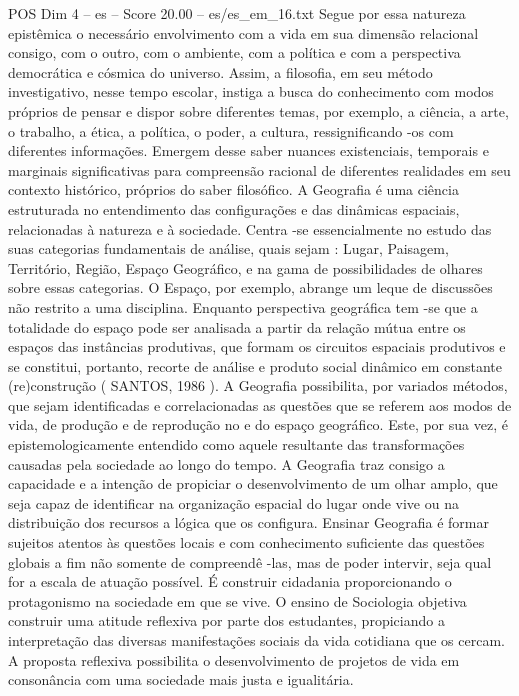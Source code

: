 \begin{textsample}{POS Dim 4 – es – Score 20.00 – es/es\_em\_16.txt}
Segue por essa natureza epistêmica o necessário envolvimento com a vida em sua dimensão relacional consigo, com o outro, com o ambiente, com a política e com a perspectiva democrática e cósmica do universo.
Assim, a filosofia, em seu método investigativo, nesse tempo escolar, instiga a busca do conhecimento com modos próprios de pensar e dispor sobre diferentes temas, por exemplo, a ciência, a arte, o trabalho, a ética, a política, o poder, a cultura, ressignificando -os com diferentes informações.
Emergem desse saber nuances existenciais, temporais e marginais significativas para compreensão racional de diferentes realidades em seu contexto histórico, próprios do saber filosófico.
A Geografia é uma ciência estruturada no entendimento das configurações e das dinâmicas espaciais, relacionadas à natureza e à sociedade.
Centra -se essencialmente no estudo das suas categorias fundamentais de análise, quais sejam : Lugar, Paisagem, Território, Região, Espaço Geográfico, e na gama de possibilidades de olhares sobre essas categorias.
O Espaço, por exemplo, abrange um leque de discussões não restrito a uma disciplina.
Enquanto perspectiva geográfica tem -se que a totalidade do espaço pode ser analisada a partir da relação mútua entre os espaços das instâncias produtivas, que formam os circuitos espaciais produtivos e se constitui, portanto, recorte de análise e produto social dinâmico em constante (re)construção ( SANTOS, 1986 ).
A Geografia possibilita, por variados métodos, que sejam identificadas e correlacionadas as questões que se referem aos modos de vida, de produção e de reprodução no e do espaço geográfico.
Este, por sua vez, é epistemologicamente entendido como aquele resultante das transformações causadas pela sociedade ao longo do tempo.
A Geografia traz consigo a capacidade e a intenção de propiciar o desenvolvimento de um olhar amplo, que seja capaz de identificar na organização espacial do lugar onde vive ou na distribuição dos recursos a lógica que os configura.
Ensinar Geografia é formar sujeitos atentos às questões locais e com conhecimento suficiente das questões globais a fim não somente de compreendê -las, mas de poder intervir, seja qual for a escala de atuação possível.
É construir cidadania proporcionando o protagonismo na sociedade em que se vive.
O ensino de Sociologia objetiva construir uma atitude reflexiva por parte dos estudantes, propiciando a interpretação das diversas manifestações sociais da vida cotidiana que os cercam.
A proposta reflexiva possibilita o desenvolvimento de projetos de vida em consonância com uma sociedade mais justa e igualitária.

\end{textsample}
